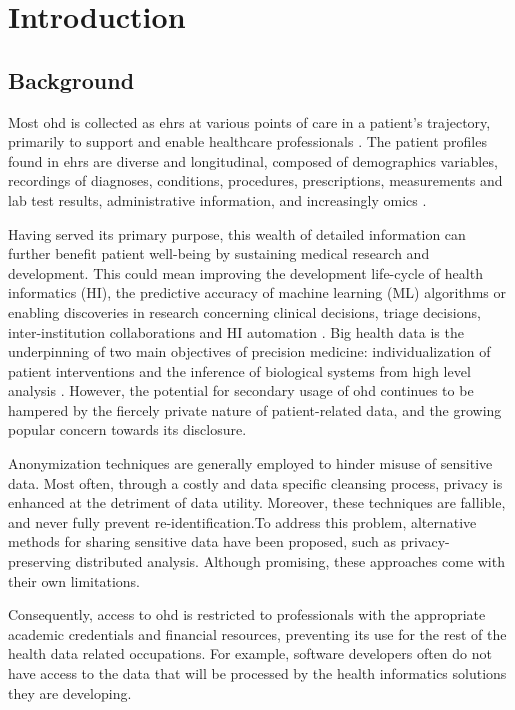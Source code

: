 \section{Introduction}
\subsection{Background}
Most \gls{ohd} is collected as \glspl{ehr} at various points of care in a patient’s trajectory, primarily to support and enable healthcare professionals \cite{Cowie_2016}. The patient profiles found in \glspl{ehr} are diverse and longitudinal, composed of demographics variables, recordings of diagnoses, conditions, procedures, prescriptions, measurements and lab test results, administrative information, and increasingly omics \cite{Ohdsi2020-vf}.\par
Having served its primary purpose, this wealth of detailed information can further benefit patient well-being by sustaining medical research and development. This could mean improving the development life-cycle of health informatics (HI), the predictive accuracy of machine learning (ML) algorithms or enabling discoveries in research concerning clinical decisions, triage decisions, inter-institution collaborations and HI automation \cite{Rudin_2020}. Big health data is the underpinning of two main objectives of precision medicine: individualization of patient interventions and the inference of biological systems from high level analysis \cite{Capobianco2020}. However, the potential for secondary usage of \gls{ohd} continues to be hampered by the fiercely private nature of patient-related data, and the growing popular concern towards its disclosure.\par
Anonymization techniques are generally employed to hinder misuse of sensitive data. Most often, through a costly and data specific cleansing process, privacy is enhanced at the detriment of data utility. Moreover, these techniques are fallible, and never fully prevent re-identification.To address this problem, alternative methods for sharing sensitive data have been proposed, such as privacy-preserving distributed analysis. Although promising, these approaches come with their own limitations.\par
Consequently, access to \gls{ohd} is restricted to professionals with the appropriate academic credentials and financial resources, preventing its use for the rest of the health data related occupations. For example, software developers often do not have access to the data that will be processed by the health informatics solutions they are developing.

